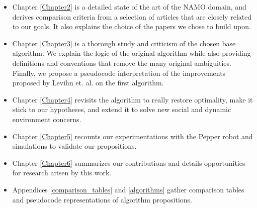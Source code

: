 \begin{itemize}
  \item Chapter \ref{Chapter2} is a detailed state of the art of the NAMO domain, and derives comparison criteria from a selection of articles that are closely related to our goals. It also explains the choice of the papers we chose to build upon.
  \item Chapter \ref{Chapter3} is a thorough study and criticism of the chosen base algorithm. We explain the logic of the original algorithm while also providing definitions and conventions that remove the many original ambiguities. Finally, we propose a pseudocode interpretation of the improvements proposed by Levihn et. al. on the first algorithm.
  \item Chapter \ref{Chapter4} revisits the algorithm to really restore optimality, make it stick to our hypotheses, and extend it to solve new social and dynamic environment concerns.
  \item Chapter \ref{Chapter5} recounts our experimentations with the Pepper robot and simulations to validate our propositions.
  \item Chapter \ref{Chapter6} summarizes our contributions and details opportunities for research arisen by this work.
  \item Appendices \ref{comparison_tables} and \ref{algorithms} gather comparison tables and pseudocode representations of algorithm propositions.
\end{itemize}
